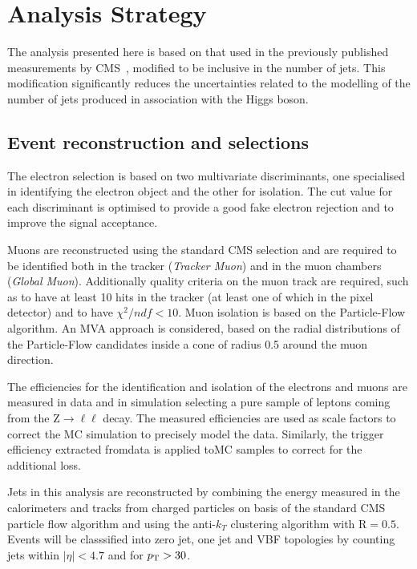 \section{Analysis Strategy}
\label{sec:AnalysisStrategy}

The analysis presented here is based on that used in the previously published \hwwllnn{}
measurements by CMS~\cite{Chatrchyan:2013iaa}, modified to be inclusive in the number of jets. 
This modification significantly reduces the uncertainties related to the modelling of the number of jets produced in association with the Higgs boson.


\subsection{Event reconstruction and selections}\label{sec:Selections}


The electron selection is based on two multivariate discriminants, one specialised in identifying the electron object and the other for isolation. The cut value for each discriminant is optimised to provide a good fake electron rejection and to improve the signal acceptance.

Muons are reconstructed using the standard CMS selection and are required to be identified both in the tracker (\textit{Tracker Muon}) and in the muon chambers (\textit{Global Muon}). Additionally quality criteria on the muon track are required, such as to have at least 10 hits in the tracker (at least one of which in the pixel detector) and to have $\chi^2/ndf < 10$.
Muon isolation is based on the Particle-Flow algorithm. An MVA approach is considered, based on the radial distributions of the Particle-Flow candidates inside a cone of radius 0.5 around the muon direction.

The efficiencies for the identification and isolation of the electrons and muons are measured in data and in simulation selecting a pure sample of leptons coming from the Z$\to\ell\ell$ decay. The measured efficiencies are used as scale factors to correct the MC simulation to precisely model the data. Similarly, the trigger efficiency extracted fromdata is applied toMC samples to correct for the additional loss.

Jets in this analysis are reconstructed by combining the energy measured in the calorimeters and tracks from charged particles on basis of the standard CMS particle flow algorithm and using the anti-$k_T$ clustering algorithm with $\mathrm{R} = 0.5$. Events will be classsified into zero jet, one jet and VBF topologies by counting jets within $|\eta| < 4.7$ and for $p_\mathrm{T} > 30$\GeV.

